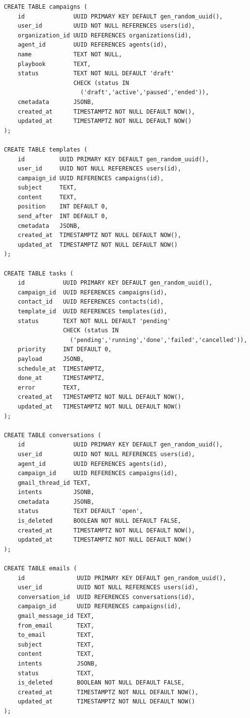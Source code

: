 \documentclass[a4paper]{article}
\begin{document}
\begin{tcolorbox}[sqlstyle, title=Campaign and Outreach]
\begin{Verbatim}[fontsize=\small]
CREATE TABLE campaigns (
    id              UUID PRIMARY KEY DEFAULT gen_random_uuid(),
    user_id         UUID NOT NULL REFERENCES users(id),
    organization_id UUID REFERENCES organizations(id),
    agent_id        UUID REFERENCES agents(id),
    name            TEXT NOT NULL,
    playbook        TEXT,
    status          TEXT NOT NULL DEFAULT 'draft'
                    CHECK (status IN
                      ('draft','active','paused','ended')),
    cmetadata       JSONB,
    created_at      TIMESTAMPTZ NOT NULL DEFAULT NOW(),
    updated_at      TIMESTAMPTZ NOT NULL DEFAULT NOW()
);

CREATE TABLE templates (
    id          UUID PRIMARY KEY DEFAULT gen_random_uuid(),
    user_id     UUID NOT NULL REFERENCES users(id),
    campaign_id UUID REFERENCES campaigns(id),
    subject     TEXT,
    content     TEXT,
    position    INT DEFAULT 0,
    send_after  INT DEFAULT 0,
    cmetadata   JSONB,
    created_at  TIMESTAMPTZ NOT NULL DEFAULT NOW(),
    updated_at  TIMESTAMPTZ NOT NULL DEFAULT NOW()
);

CREATE TABLE tasks (
    id           UUID PRIMARY KEY DEFAULT gen_random_uuid(),
    campaign_id  UUID REFERENCES campaigns(id),
    contact_id   UUID REFERENCES contacts(id),
    template_id  UUID REFERENCES templates(id),
    status       TEXT NOT NULL DEFAULT 'pending'
                 CHECK (status IN
                   ('pending','running','done','failed','cancelled')),
    priority     INT DEFAULT 0,
    payload      JSONB,
    schedule_at  TIMESTAMPTZ,
    done_at      TIMESTAMPTZ,
    error        TEXT,
    created_at   TIMESTAMPTZ NOT NULL DEFAULT NOW(),
    updated_at   TIMESTAMPTZ NOT NULL DEFAULT NOW()
);

CREATE TABLE conversations (
    id              UUID PRIMARY KEY DEFAULT gen_random_uuid(),
    user_id         UUID NOT NULL REFERENCES users(id),
    agent_id        UUID REFERENCES agents(id),
    campaign_id     UUID REFERENCES campaigns(id),
    gmail_thread_id TEXT,
    intents         JSONB,
    cmetadata       JSONB,
    status          TEXT DEFAULT 'open',
    is_deleted      BOOLEAN NOT NULL DEFAULT FALSE,
    created_at      TIMESTAMPTZ NOT NULL DEFAULT NOW(),
    updated_at      TIMESTAMPTZ NOT NULL DEFAULT NOW()
);

CREATE TABLE emails (
    id               UUID PRIMARY KEY DEFAULT gen_random_uuid(),
    user_id          UUID NOT NULL REFERENCES users(id),
    conversation_id  UUID REFERENCES conversations(id),
    campaign_id      UUID REFERENCES campaigns(id),
    gmail_message_id TEXT,
    from_email       TEXT,
    to_email         TEXT,
    subject          TEXT,
    content          TEXT,
    intents          JSONB,
    status           TEXT,
    is_deleted       BOOLEAN NOT NULL DEFAULT FALSE,
    created_at       TIMESTAMPTZ NOT NULL DEFAULT NOW(),
    updated_at       TIMESTAMPTZ NOT NULL DEFAULT NOW()
);
\end{Verbatim}
\end{tcolorbox}
\end{document}
